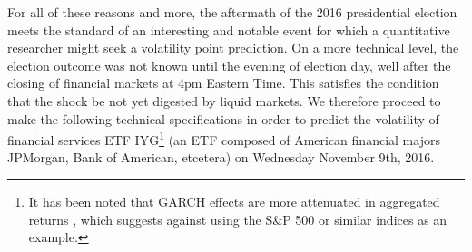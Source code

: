 \documentclass[11pt]{article}
\theoremstyle{definition}
\begin{document}
For all of these reasons and more, the aftermath of the 2016 presidential election meets the standard of an interesting and notable event for which a quantitative researcher might seek a volatility point prediction.  On a more technical level, the election outcome was not known until the evening of election day, well after the closing of financial markets at 4pm Eastern Time.  This satisfies the condition that the shock be not yet digested by liquid markets.  We therefore proceed to make the following technical specifications in order to predict the volatility of financial services ETF IYG\footnote{It has been noted that GARCH effects are more attenuated in aggregated returns \citep{zivot2009practical}, which suggests against using the S\&P 500 or similar indices as an example.} (an ETF composed of American financial majors JPMorgan, Bank of American, etcetera) on Wednesday November 9th, 2016.
\end{document}
